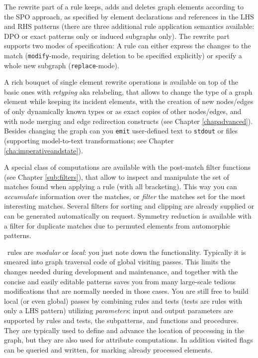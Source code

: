 The rewrite part of a rule keeps, adds and deletes graph elements according to the SPO approach, as specified by element declarations and references in the LHS and RHS patterns (there are three additional rule application semantics available: DPO or exact patterns only or induced subgraphs only).
The rewrite part supports two modes of specification: A rule can either express the changes to the match (\texttt{modify}-mode, requiring deletion to be specified explicitly) or specify a whole new subgraph (\texttt{replace}-mode).

A rich bouquet of single element rewrite operations is available on top of the basic ones with \emph{retyping} aka relabeling, that allows to change the type of a graph element while keeping its incident elements, with the creation of new nodes/edges of only dynamically known types or as exact copies of other nodes/edges, and with node merging and edge redirection constructs (see Chapter \ref{chapadvanced}).
Besides changing the graph can you \texttt{emit} user-defined text to \texttt{stdout} or files (supporting model-to-text transformations; see Chapter \ref{cha:imperativeandstate}).

A special class of computations are available with the post-match filter functions (see Chapter \ref{sub:filters}), that allow to inspect and manipulate the set of matches found when applying a rule (with all bracketing). 
This way you can \emph{accumulate} information over the matches, or \emph{filter} the matches set for the most interesting matches.
Several filters for sorting and clipping are already supplied or can be generated automatically on request.
Symmetry reduction is available with a filter for duplicate matches due to permuted elements from automorphic patterns.

\GrG\ rules are \emph{modular} or \emph{local}: you just note down the functionality.
Typically it is smeared into graph traversal code of global visiting passes.
This limits the changes needed during development and maintenance, and together with the concise and easily editable patterns saves you from many large-scale tedious modifications that are normally needed in those cases.
You are still free to build local (or even global) passes by combining rules and tests (tests are rules with only a LHS pattern) utilizing \emph{parameters}: input and output parameters are supported by rules and tests, the subpatterns, and functions and procedures.
They are typically used to define and advance the location of processing in the graph, but they are also used for attribute computations.
In addition visited flags can be queried and written, for marking already processed elements.

